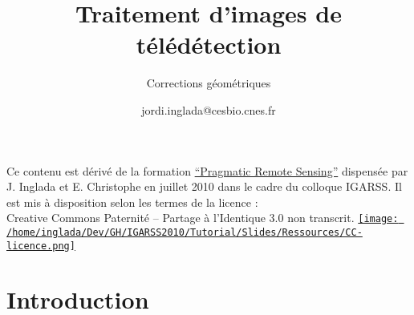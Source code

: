 \documentclass[compress]{beamer}
\title{Traitement d'images de télédétection}
\subtitle{Corrections géométriques}
\author
{jordi.inglada@cesbio.cnes.fr}
\institute[Cesbio] %
{\textsc{Centre d'Études Spatiales de la Biosphère, Toulouse, France}}
\date{}
\begin{document}
\begin{frame}
  \titlepage
  \begin{center}
{\tiny Ce contenu est dérivé de la formation \href{http://www.orfeo-toolbox.org/packages/PragmaticRemoteSensing-handout.pdf}{``Pragmatic Remote
  Sensing''} dispensée par J. Inglada et E. Christophe en juillet 2010
  dans le cadre du colloque IGARSS. Il est mis à disposition selon les termes de la licence :\\
Creative Commons Paternité – Partage à l’Identique 3.0 non transcrit.} \href{http://creativecommons.org/licenses/by-sa/3.0/}{\texttt{[image: /home/inglada/Dev/GH/IGARSS2010/Tutorial/Slides/Ressources/CC-licence.png]}}    
  \end{center}
\end{frame}


\section*{Introduction}
\end{document}
